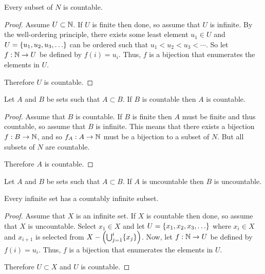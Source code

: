 \documentclass[letterpaper,12pt,fleqn]{article}
\begin{document}
\begin{theorem}
  Every subset of \(N\) is countable.
\end{theorem}

\begin{proof}
  Assume \(U\subset\mathbb{N}\).  If \(U\) is finite then done, so assume that \(U\) is infinite.  By the well-ordering
  principle, there exists some least element \(u_1\in U\) and \(U=\{u_1,u_2,u_3,\ldots\}\) can be ordered such
  that \(u_1<u_2<u_3<\cdots\).  So let \(f:\mathbb{N}\to U\) be defined by \(f(i)=u_i\).  Thus, \(f\) is a bijection that
  enumerates the elements in \(U\).

  Therefore \(U\) is countable.
\end{proof}

\begin{corollary}
  Let \(A\) and \(B\) be sets such that \(A\subset B\).  If \(B\) is countable then \(A\) is countable.
\end{corollary}

\begin{proof}
  Assume that \(B\) is countable.  If \(B\) is finite then \(A\) must be finite and thus countable, so assume that
  \(B\) is infinite.  This means that there exists a bijection \(f:B\to\mathbb{N}\), and so \(f_A:A\to\mathbb{N}\) must be a
  bijection to a subset of \(N\).  But all subsets of \(N\) are countable.

  Therefore \(A\) is countable.
\end{proof}

\begin{corollary}
  Let \(A\) and \(B\) be sets such that \(A\subset B\).  If \(A\) is uncountable then \(B\) is uncountable.
\end{corollary}

\begin{theorem}
  Every infinite set has a countably infinite subset.
\end{theorem}

\begin{proof}
  Assume that \(X\) is an infinite set.  If \(X\) is countable then done, so assume that \(X\) is uncountable.
  Select \(x_1\in X\) and let \(U=\{x_1,x_2,x_3,\ldots\}\) where \(x_i\in X\) and \(x_{i+1}\) is selected from
  \(X-\left(\bigcup_{j=1}^i\{x_j\}\right)\).  Now, let \(f:\mathbb{N}\to U\) be defined by \(f(i)=u_i\).  Thus, \(f\) is a
  bijection that enumerates the elements in \(U\).

  Therefore \(U\subset X\) and \(U\) is countable.
\end{proof}
\end{document}
